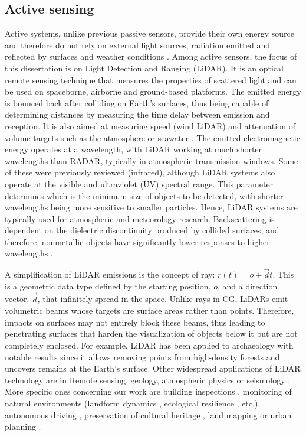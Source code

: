 \subsection{Active sensing}

Active systems, unlike previous passive sensors, provide their own energy source and therefore do not rely on external light sources, radiation emitted and reflected by surfaces and weather conditions \cite{dong_lidar_2018}. Among active sensors, the focus of this dissertation is on Light Detection and Ranging (LiDAR). It is an optical remote sensing technique that measures the properties of scattered light and can be used on spaceborne, airborne and ground-based platforms. The emitted energy is bounced back after colliding on Earth's surfaces, thus being capable of determining distances by measuring the time delay between emission and reception. It is also aimed at measuring speed (wind LiDAR) and attenuation of volume targets such as the atmosphere or seawater \cite{emery_introduction_2017}. The emitted electromagnetic energy operates at a wavelength, with LiDAR working at much shorter wavelengths than RADAR, typically in atmospheric transmission windows. Some of these were previously reviewed (infrared), although LiDAR systems also operate at the visible and ultraviolet (UV) spectral range. This parameter determines which is the minimum size of objects to be detected, with shorter wavelengths being more sensitive to smaller particles. Hence, LiDAR systems are typically used for atmospheric and meteorology research. Backscattering is dependent on the dielectric discontinuity produced by collided surfaces, and therefore, nonmetallic objects have significantly lower responses to higher wavelengths \cite{dong_lidar_2018}. 

A simplification of LiDAR emissions is the concept of ray: $r(t) = o + \vec{d}t$. This is a geometric data type defined by the starting position, $o$, and a direction vector, $\vec{d}$, that infinitely spread in the space. Unlike rays in CG, LiDARs emit volumetric beams whose targets are surface areas rather than points. Therefore, impacts on surfaces may not entirely block these beams, thus leading to penetrating surfaces that harden the visualization of objects below it but are not completely enclosed. For example, LiDAR has been applied to archaeology with notable results since it allows removing points from high-density forests and uncovers remains at the Earth's surface. Other widespread applications of LiDAR technology are in \gls{Remote sensing}, geology, atmospheric physics or seismology \cite{emery_introduction_2017}. More specific ones concerning our work are building inspections \cite{shariq_revolutionising_2020}, monitoring of natural environments (landform dynamics \cite{guisado-pintado_3d_2019}, ecological resilience \cite{mitasova_geospatial_2010}, etc.), autonomous driving \cite{kuutti_survey_2021}, preservation of cultural heritage \cite{andriasyan_point_2020}, land mapping or urban planning \cite{zhou_street-view_2022}.

